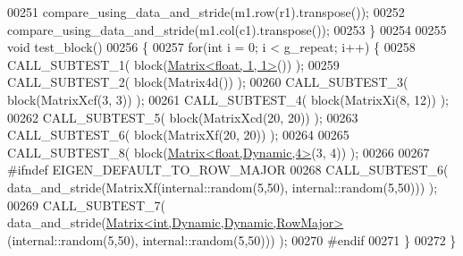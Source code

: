 \begin{DoxyCode}
00251   compare\_using\_data\_and\_stride(m1.row(r1).transpose());
00252   compare\_using\_data\_and\_stride(m1.col(c1).transpose());
00253 \}
00254 
00255 \textcolor{keywordtype}{void} test\_block()
00256 \{
00257   \textcolor{keywordflow}{for}(\textcolor{keywordtype}{int} i = 0; i < g\_repeat; i++) \{
00258     CALL\_SUBTEST\_1( block(\hyperlink{group___core___module_class_eigen_1_1_matrix}{Matrix<float, 1, 1>}()) );
00259     CALL\_SUBTEST\_2( block(Matrix4d()) );
00260     CALL\_SUBTEST\_3( block(MatrixXcf(3, 3)) );
00261     CALL\_SUBTEST\_4( block(MatrixXi(8, 12)) );
00262     CALL\_SUBTEST\_5( block(MatrixXcd(20, 20)) );
00263     CALL\_SUBTEST\_6( block(MatrixXf(20, 20)) );
00264 
00265     CALL\_SUBTEST\_8( block(\hyperlink{group___core___module_class_eigen_1_1_matrix}{Matrix<float,Dynamic,4>}(3, 4)) );
00266 
00267 \textcolor{preprocessor}{#ifndef EIGEN\_DEFAULT\_TO\_ROW\_MAJOR}
00268     CALL\_SUBTEST\_6( data\_and\_stride(MatrixXf(internal::random(5,50), internal::random(5,50))) );
00269     CALL\_SUBTEST\_7( data\_and\_stride(\hyperlink{group___core___module_class_eigen_1_1_matrix}{Matrix<int,Dynamic,Dynamic,RowMajor>}
      (internal::random(5,50), internal::random(5,50))) );
00270 \textcolor{preprocessor}{#endif}
00271   \}
00272 \}
\end{DoxyCode}

